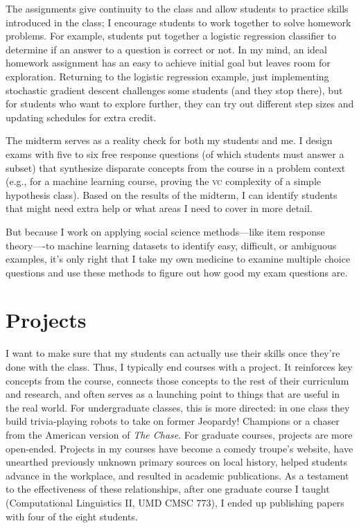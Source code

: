 \documentclass[11pt]{amsart}
\newcommand{\abr}[1]{\textsc{#1}}
\begin{document}
The assignments give continuity to the class and allow students to
practice skills introduced in the class; I encourage students to work
together to solve homework problems.
%
For example, students put together a logistic regression classifier to
determine if an answer to a question is correct or not.  In my mind,
an ideal homework assignment has an easy to achieve initial goal but
leaves room for exploration.  Returning to the logistic regression
example, just implementing stochastic gradient descent challenges some
students (and they stop there), but for students who want to explore
further, they can try out different step sizes and updating schedules
for extra credit.

The midterm serves as a reality check for both my students and me.  I
design exams with five to six free response questions (of which
students must answer a subset) that synthesize disparate concepts from
the course in a problem context (e.g., for a machine learning course,
proving the \abr{vc} complexity of a simple hypothesis class).  Based
on the results of the midterm, I can identify students that might need
extra help or what areas I need to cover in more detail.

But because I work on applying social science methods—like item
response theory—-to machine learning datasets to identify easy,
difficult, or ambiguous examples, it's only right that I take my own
medicine to examine multiple choice questions and use these methods to
figure out how good my exam questions are.

\section{Projects}

I want to make sure that my students can actually use their skills
once they're done with the class.  Thus, I typically end courses with
a project.  It reinforces key concepts from the course, connects those
concepts to the rest of their curriculum and research, and often
serves as a launching point to things that are useful in the real
world.  For undergraduate classes, this is more directed: in one class
they build trivia-playing robots to take on former Jeopardy! Champions
or a chaser from the American version of \textit{The Chase}.  For
graduate courses, projects are more open-ended.  Projects in my
courses have become a comedy troupe's website, have unearthed
previously unknown primary sources on local history, helped students
advance in the workplace, and resulted in academic publications.  As a
testament to the effectiveness of these relationships, after one
graduate course I taught (Computational Linguistics II, UMD CMSC 773),
I ended up publishing papers with four of the eight students.
\end{document}
